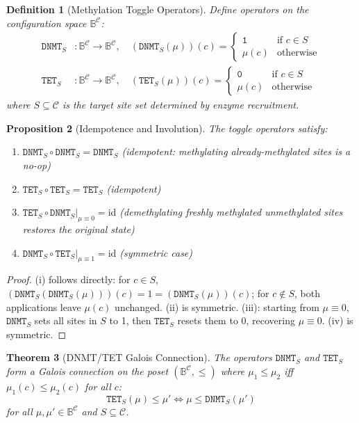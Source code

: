 \documentclass[12pt,a4paper]{article}
\newtheorem{theorem}{Theorem}[section]
\newtheorem{proposition}[theorem]{Proposition}
\newtheorem{definition}[theorem]{Definition}
\newcommand{\DNMT}{\texttt{DNMT}}
\newcommand{\TET}{\texttt{TET}}
\newcommand{\id}{\mathrm{id}}
\begin{document}
\begin{definition}[Methylation Toggle Operators]
\label{def:toggle-ops}
Define operators on the configuration space $\mathbb{B}^{\mathcal{C}}$:
\begin{align}
    \DNMT_S &: \mathbb{B}^{\mathcal{C}} \to \mathbb{B}^{\mathcal{C}}, \quad (\DNMT_S(\mu))(c) = \begin{cases} \texttt{1} & \text{if } c \in S \\ \mu(c) & \text{otherwise} \end{cases} \\[6pt]
    \TET_S &: \mathbb{B}^{\mathcal{C}} \to \mathbb{B}^{\mathcal{C}}, \quad (\TET_S(\mu))(c) = \begin{cases} \texttt{0} & \text{if } c \in S \\ \mu(c) & \text{otherwise} \end{cases}
\end{align}
where $S \subseteq \mathcal{C}$ is the target site set determined by enzyme recruitment.
\end{definition}

\begin{proposition}[Idempotence and Involution]
\label{prop:idempotent}
The toggle operators satisfy:
\begin{enumerate}[label=(\roman*)]
    \item $\DNMT_S \circ \DNMT_S = \DNMT_S$ \quad (idempotent: methylating already-methylated sites is a no-op)
    \item $\TET_S \circ \TET_S = \TET_S$ \quad (idempotent)
    \item $\TET_S \circ \DNMT_S |_{\mu \equiv 0} = \id$ \quad (demethylating freshly methylated unmethylated sites restores the original state)
    \item $\DNMT_S \circ \TET_S |_{\mu \equiv 1} = \id$ \quad (symmetric case)
\end{enumerate}
\end{proposition}

\begin{proof}
(i) follows directly: for $c \in S$, $(\DNMT_S(\DNMT_S(\mu)))(c) = 1 = (\DNMT_S(\mu))(c)$; for $c \notin S$, both applications leave $\mu(c)$ unchanged. (ii) is symmetric. (iii): starting from $\mu \equiv 0$, $\DNMT_S$ sets all sites in $S$ to 1, then $\TET_S$ resets them to 0, recovering $\mu \equiv 0$. (iv) is symmetric.
\end{proof}

\begin{theorem}[DNMT/TET Galois Connection]
\label{thm:galois}
The operators $\DNMT_S$ and $\TET_S$ form a Galois connection on the poset $(\mathbb{B}^{\mathcal{C}}, \leq)$ where $\mu_1 \leq \mu_2$ iff $\mu_1(c) \leq \mu_2(c)$ for all $c$:
\[
    \TET_S(\mu) \leq \mu' \iff \mu \leq \DNMT_S(\mu')
\]
for all $\mu, \mu' \in \mathbb{B}^{\mathcal{C}}$ and $S \subseteq \mathcal{C}$.
\end{theorem}
\end{document}
